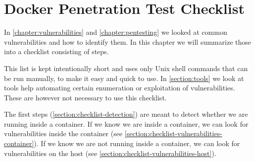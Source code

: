 \chapter{Docker Penetration Test Checklist}\label{chapter:checklist}
In \autoref{chapter:vulnerabilities} and \autoref{chapter:pentesting} we looked at common vulnerabilities and how to identify them. In this chapter we will summarize those into a checklist consisting of steps.

This list is kept intentionally short and uses only Unix shell commands that can be run manually, to make it easy and quick to use. In \autoref{section:tools} we look at tools help automating certain enumeration or exploitation of vulnerabilities. These are however not necessary to use this checklist.

\medskip

The first steps (\autoref{section:checklist-detection}) are meant to detect whether we are running inside a container. If we know we are inside a container, we can look for vulnerabilities inside the container (see \autoref{section:checklist-vulnerabilities-container}). If we know we are not running inside a container, we can look for vulnerabilities on the host (see \autoref{section:checklist-vulnerabilities-host}).




